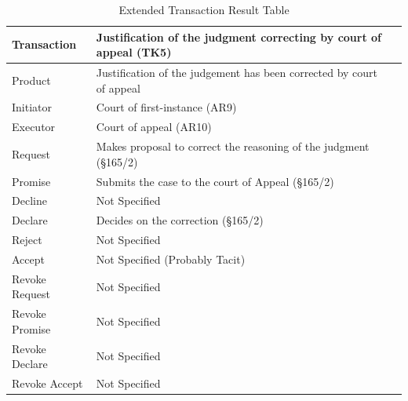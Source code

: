 \begin{landscape}
\begin{table}[h]
\caption{Extended Transaction Result Table}
\label{tab:etrt}
\begin{tabular}{|l||l|l|}
\hline
Transaction  & Justification of the judgment correcting by court of appeal  (TK5) \\ \hline
Product      & Justification of the judgement has been corrected by court of appeal  \\ \hline
Initiator      &  Court of first-instance (AR9) \\ \hline
Executor       &  Court of appeal (AR10) \\ \hline
Request        & Makes proposal to correct the reasoning of the judgment (\S165/2)  \\ \hline
Promise        &  Submits the case to the court of Appeal (\S165/2)    \\ \hline
Decline        &  Not Specified   \\ \hline
Declare        & Decides on the correction (\S165/2)  \\ \hline
Reject         &  Not Specified   \\ \hline
Accept         & Not Specified (Probably Tacit) \\ \hline
Revoke Request & Not Specified       \\ \hline
Revoke Promise & Not Specified  \\ \hline
Revoke Declare & Not Specified      \\ \hline
Revoke Accept  &  Not Specified \\ \hline
\end{tabular}
\end{table}


\end{landscape}
